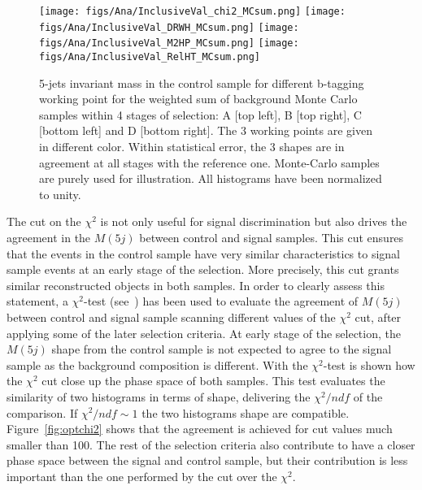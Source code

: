 \begin{figure}[!Hhtbp]
  \begin{center}
    \texttt{[image: figs/Ana/InclusiveVal\_chi2\_MCsum.png]}
    \texttt{[image: figs/Ana/InclusiveVal\_DRWH\_MCsum.png]}
    \texttt{[image: figs/Ana/InclusiveVal\_M2HP\_MCsum.png]}
    \texttt{[image: figs/Ana/InclusiveVal\_RelHT\_MCsum.png]}
    \caption{5-jets invariant mass in the control sample for different b-tagging working point for the weighted sum of background Monte Carlo samples within 4 stages of selection: A [top left], B [top right], C [bottom left] and D [bottom right]. The 3 working points are given in different color. Within statistical error, the 3 shapes are in agreement at all stages with the reference one. Monte-Carlo samples are purely used for illustration. All histograms have been normalized to unity.}
    \label{fig:StageWPSum}
  \end{center}
\end{figure}

The cut on the $\chi^{2}$ is not only useful for signal discrimination but also drives the agreement in the $M(5j)$ between control and signal samples. This cut ensures that the events in the control sample have very similar characteristics to signal sample events at an early stage of the selection. More precisely, this cut grants similar reconstructed objects in both samples. In order to clearly assess this statement, a $\chi^{2}$-test (see~\cite{2006physics...5123G}) has been used to evaluate the agreement of $M(5j)$ between control and signal sample scanning different values of the $\chi^{2}$ cut, after applying some of the later selection criteria. At early stage of the selection, the $M(5j)$ shape from the control sample is not expected to agree to the signal sample as the background composition is different. With the $\chi^{2}$-test is shown how the $\chi^{2}$ cut close up the phase space of both samples. This test evaluates the similarity of two histograms in terms of shape, delivering the $\chi^{2}/ndf$ of the comparison. If ${\chi^{2}/ndf\sim 1}$ the two histograms shape are compatible. Figure~\ref{fig:optchi2} shows that the agreement is achieved for cut values much smaller than 100. The rest of the selection criteria also contribute to have a closer phase space between the signal and control sample, but their contribution is less important than the one performed by the cut over the $\chi^{2}$.

